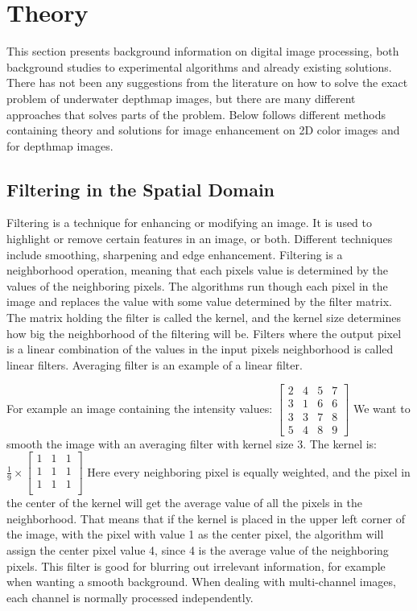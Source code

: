 \section{Theory}\label{theory}
This section presents background information on digital image processing, both background studies to experimental algorithms and already existing solutions. There has not been any suggestions from the literature on how to solve the exact problem of underwater depthmap images, but there are many different approaches that solves parts of the problem.
Below follows different methods containing theory and solutions for image enhancement on 2D color images and for depthmap images.


\subsection{Filtering in the Spatial Domain}

Filtering is a technique for enhancing or modifying an image. It is used to highlight or remove certain features in an image, or both. Different techniques include smoothing, sharpening and edge enhancement. 
Filtering is a neighborhood operation, meaning that each pixels value is determined by the values of the neighboring pixels. The algorithms run though each pixel in the image and replaces the value with some value determined by the filter matrix. The matrix holding the filter is called the kernel, and the kernel size determines how big the neighborhood of the filtering will be. Filters where the output pixel is a linear combination of the values in the input pixels neighborhood is called linear filters. Averaging filter is an example of a linear filter.

For example an image containing the intensity values: 
$\begin{bmatrix}
    2 & 4 & 5 & 7 \\
    3 & 1 & 6 & 6 \\
    3 & 3 & 7 & 8 \\
    5 & 4 & 8 & 9 
\end{bmatrix}$
We want to smooth the image with an averaging filter with kernel size 3. The kernel is: 
$\frac{1}{9} \times 
\begin{bmatrix}
    1 & 1 & 1 \\
    1 & 1 & 1 \\
    1 & 1 & 1 \\
\end{bmatrix}$
Here every neighboring pixel is equally weighted, and the pixel in the center of the kernel will get the average value of all the pixels in the neighborhood. That means that if the kernel is placed in the upper left corner of the image, with the pixel with value 1 as the center pixel, the algorithm will assign the center pixel value 4, since 4 is the average value of the neighboring pixels.
This filter is good for blurring out irrelevant information, for example when wanting a smooth background.
When dealing with multi-channel images, each channel is normally processed independently.

